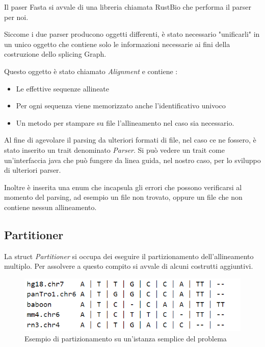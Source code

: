 Il paser Fasta si avvale di una libreria chiamata RustBio che performa il parser per noi.

Siccome i due parser producono oggetti differenti, è stato necessario "unificarli" in un unico oggetto che contiene solo le informazioni necessarie ai fini della costruzione dello splicing Graph.

Questo oggetto è stato chiamato \textit{Alignment} e contiene :

\begin{itemize}
    \item Le effettive sequenze allineate 
    \item Per ogni sequenza viene memorizzato anche l'identificativo univoco
    \item Un metodo per stampare su file l'allineamento nel caso sia necessario.
\end{itemize}

Al fine di agevolare il parsing da ulteriori formati di file, nel caso ce ne fossero, è stato inserito un trait denominato \textit{Parser}. Si può vedere un trait come un'interfaccia java che può fungere da linea guida, nel nostro caso, per lo sviluppo di ulteriori parser.

Inoltre è inserita una enum che incapsula gli errori che possono verificarsi al momento del parsing, ad esempio un file non trovato, oppure un file che non contiene nessun allineamento.

\newpage

\subsection{Partitioner}
La struct \textit{Partitioner} si occupa dei eseguire il partizionamento dell'allineamento multiplo. Per assolvere a questo compito si avvale di alcuni costrutti aggiuntivi.

\begin{figure}[ht]
    \centering
    \includegraphics[scale=1]{images/partitioning_example.PNG}
    \caption{Esempio di partizionamento su un'istanza semplice del problema}
    \label{fig:partitioning_example}
\end{figure}

